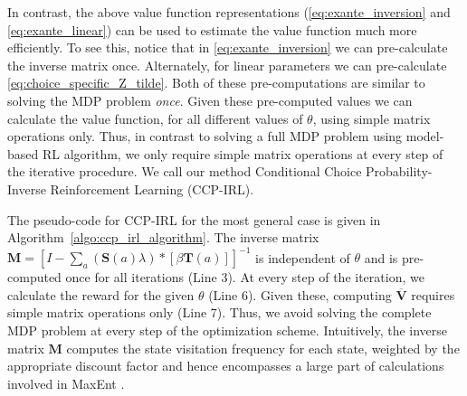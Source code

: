 \documentclass{article}
\begin{document}
In contrast, the above value function representations (\eqref{eq:exante_inversion} and \eqref{eq:exante_linear}) can be used to estimate the value function much more efficiently. To see this, notice that in \eqref{eq:exante_inversion} we can pre-calculate the inverse matrix once. Alternately, for linear parameters we can pre-calculate \eqref{eq:choice_specific_Z_tilde}. Both of these pre-computations are similar to solving the MDP problem \textit{once}. Given these pre-computed values we can calculate the value function, for all different values of $\theta$, using simple matrix operations only. Thus, in contrast to solving a full MDP problem using model-based RL algorithm, we only require simple matrix operations at every step of the iterative procedure. We call our method Conditional Choice Probability-Inverse Reinforcement Learning (CCP-IRL).

The pseudo-code for CCP-IRL for the most general case is given in Algorithm~\ref{algo:ccp_irl_algorithm}.
The inverse matrix $\mathbf{M}=\left[I-\sum_{a}(\mathbf{S}(a) \lambda) *\left[ \beta \mathbf{T}(a)  \right]\right]^{-1}$ is independent of $\theta$ and is pre-computed once for all iterations (Line 3).
At every step of the iteration, we calculate the reward for the given $\theta$ (Line 6). Given these, computing $\mathbf{\overline{V}}$ requires simple matrix operations only (Line 7). Thus, we avoid solving the complete MDP problem at every step of the optimization scheme.
Intuitively, the inverse matrix $\mathbf{M}$ computes the state visitation frequency for each state, weighted by the appropriate discount factor and hence encompasses a large part of calculations involved in MaxEnt \cite{ziebart_phd}.



\end{document}
